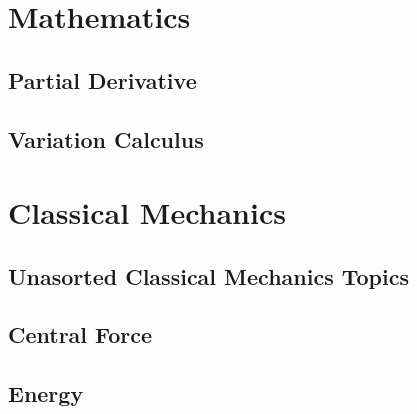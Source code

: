 \documentclass[10pt]{report}
\begin{document}
\chapter*{Mathematics}
\pagestyle{empty}



\section*{Partial Derivative}
\clearpage
\clearpage

\section*{Variation Calculus}
\clearpage
\clearpage

\chapter*{Classical Mechanics}
\section*{Unasorted Classical Mechanics Topics}
\clearpage
\clearpage

\section*{Central Force}
\clearpage

\section*{Energy}
\clearpage
\end{document}
